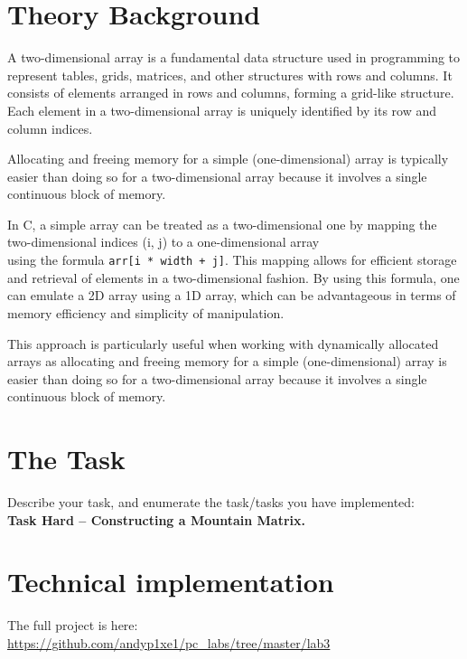 \documentclass[12pt]{article}
\begin{document}
\setcounter{page}{2}
\pagestyle{fancy}
\fancyhf{}
\rhead{\thepage}

\section*{Theory Background}
A two-dimensional array is a fundamental data structure used in programming to represent tables, grids, matrices, and other structures with rows and columns. It consists of elements arranged in rows and columns, forming a grid-like structure. Each element in a two-dimensional array is uniquely identified by its row and column indices.

Allocating and freeing memory for a simple (one-dimensional) array is typically easier than doing so for a two-dimensional array because it involves a single continuous block of memory.

In C, a simple array can be treated as a two-dimensional one by mapping the two-dimensional indices (i, j) to a one-dimensional array\\
using the formula \texttt{arr[i * width + j]}\cite{arr_param}. This mapping allows for efficient storage and retrieval of elements in a two-dimensional fashion. By using this formula, one can emulate a 2D array using a 1D array, which can be advantageous in terms of memory efficiency and simplicity of manipulation.

This approach is particularly useful when working with dynamically allocated arrays as allocating and freeing memory for a simple (one-dimensional) array is easier than doing so for a two-dimensional array because it involves a single continuous block of memory.


\section*{The Task}

Describe your task, and enumerate the task/tasks you have implemented:\\
\textbf{Task Hard -- Constructing a Mountain Matrix.}


\section*{Technical implementation}
The full project is here: \url{https://github.com/andyp1xe1/pc_labs/tree/master/lab3}
\end{document}
